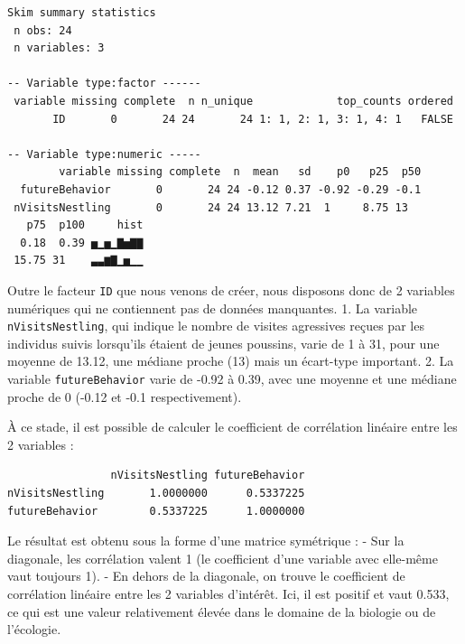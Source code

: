 \documentclass[a4paperpaper,]{article}
\newenvironment{Shaded}{\begin{snugshade}}{\end{snugshade}}
\newcommand{\KeywordTok}[1]{\textcolor[rgb]{0.12,0.11,0.11}{\textbf{#1}}}
\newcommand{\NormalTok}[1]{\textcolor[rgb]{0.12,0.11,0.11}{#1}}
\newcommand{\OperatorTok}[1]{\textcolor[rgb]{0.12,0.11,0.11}{#1}}
\newcommand{\StringTok}[1]{\textcolor[rgb]{0.75,0.01,0.01}{#1}}
\begin{document}
\begin{verbatim}
Skim summary statistics
 n obs: 24 
 n variables: 3 

-- Variable type:factor ------
 variable missing complete  n n_unique             top_counts ordered
       ID       0       24 24       24 1: 1, 2: 1, 3: 1, 4: 1   FALSE

-- Variable type:numeric -----
        variable missing complete  n  mean   sd    p0   p25  p50
  futureBehavior       0       24 24 -0.12 0.37 -0.92 -0.29 -0.1
 nVisitsNestling       0       24 24 13.12 7.21  1     8.75 13  
   p75  p100     hist
  0.18  0.39 ▅▁▅▁▇▅▇▇
 15.75 31    ▃▃▆▇▁▅▁▁
\end{verbatim}

Outre le facteur \texttt{ID} que nous venons de créer, nous disposons donc de 2 variables numériques qui ne contiennent pas de données manquantes.
1. La variable \texttt{nVisitsNestling}, qui indique le nombre de visites agressives reçues par les individus suivis lorsqu'ils étaient de jeunes poussins, varie de 1 à 31, pour une moyenne de 13.12, une médiane proche (13) mais un écart-type important.
2. La variable \texttt{futureBehavior} varie de -0.92 à 0.39, avec une moyenne et une médiane proche de 0 (-0.12 et -0.1 respectivement).

À ce stade, il est possible de calculer le coefficient de corrélation linéaire entre les 2 variables :

\begin{Shaded}
\end{Shaded}

\begin{verbatim}
                nVisitsNestling futureBehavior
nVisitsNestling       1.0000000      0.5337225
futureBehavior        0.5337225      1.0000000
\end{verbatim}

Le résultat est obtenu sous la forme d'une matrice symétrique :
- Sur la diagonale, les corrélation valent 1 (le coefficient d'une variable avec elle-même vaut toujours 1).
- En dehors de la diagonale, on trouve le coefficient de corrélation linéaire entre les 2 variables d'intérêt. Ici, il est positif et vaut 0.533, ce qui est une valeur relativement élevée dans le domaine de la biologie ou de l'écologie.
\end{document}
